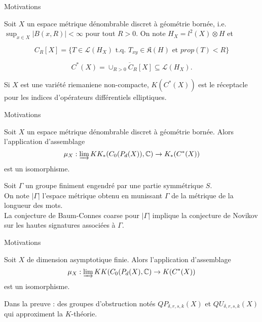 \begin{frame}{Motivations}

Soit $X$ un espace métrique dénombrable discret à géométrie bornée, i.e. $\sup_{x\in X} |B(x,R)|<\infty$ pour tout $R>0$. On note $H_X = l^2(X)\otimes H$ et 

\[C_R[X] = \{T\in \mathcal L(H_X) \text{ t.q. } T_{xy} \in \mathfrak K(H) \text{ et } prop(T) < R \}\]

\begin{definitionfr}
\[C^*(X) = \overline{\cup_{R>0} C_R[X]} \subseteq \mathcal L(H_X).\]
\end{definitionfr}
\vspace{0.3 cm}
Si $X$ est une variété riemaniene non-compacte, $K(C^*(X))$ est le réceptacle pour les indices d'opérateurs différentiels elliptiques.
\end{frame}

\begin{frame}{Motivations}
\begin{conj}
Soit $X$ un espace métrique dénombrable discret à géométrie bornée. Alors l'application d'assemblage
\[\mu_X : \varinjlim KK_*(C_0(P_d(X)),\mathbb C) \rightarrow K_*(C^*(X))\]
est un isomorphisme.
\end{conj}

Soit $\Gamma$ un groupe finiment engendré par une partie symmétrique $S$. \\
\vspace{0.3 cm}
On note $|\Gamma|$ l'espace métrique obtenu en munissant $\Gamma$ de la métrique de la longueur des mots. \\
\vspace{0.3 cm}
La conjecture de Baum-Connes coarse pour $|\Gamma |$ implique la conjecture de Novikov sur les hautes signatures associées à $\Gamma$. 
\end{frame}

\begin{frame}{Motivations}

\begin{thmfr}[Yu, 2010 \cite{Yu1}]
Soit $X$ de dimension asymptotique finie. Alors l'application d'assemblage
\[\mu_X : \varinjlim KK(C_0(P_d(X),\mathbb C) \rightarrow K(C^*(X))\]
est un isomorphisme.
\end{thmfr}
\vspace{0.3 cm}
Dans la preuve : des groupes d'obstruction notés $QP_{\delta, r ,s, k}(X)$ et $QU_{\delta, r ,s, k}(X)$ qui approximent la $K$-théorie.\\

\end{frame}

